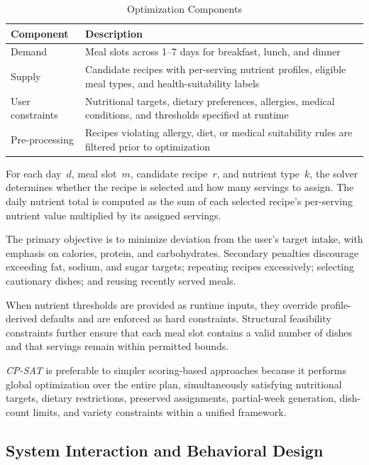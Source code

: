 \documentclass[conference]{IEEEtran}
\begin{document}
\begin{table}[H]
\caption{Optimization Components}
\label{tab:optim}
\begin{center}
\begin{tabular}{p{1.8cm}p{5.8cm}}
\toprule
\textbf{Component} & \textbf{Description} \\
\midrule
Demand & Meal slots across 1--7 days for breakfast, lunch, and dinner \\
Supply & Candidate recipes with per-serving nutrient profiles, eligible meal types, and health-suitability labels \\
User constraints & Nutritional targets, dietary preferences, allergies, medical conditions, and thresholds specified at runtime \\
Pre-processing & Recipes violating allergy, diet, or medical suitability rules are filtered prior to optimization \\
\bottomrule
\end{tabular}
\end{center}
\end{table}

For each day~$d$, meal slot~$m$, candidate recipe~$r$, and nutrient type~$k$, the solver determines whether the recipe is selected and how many servings to assign. The daily nutrient total is computed as the sum of each selected recipe's per-serving nutrient value multiplied by its assigned servings.

The primary objective is to minimize deviation from the user's target intake, with emphasis on calories, protein, and carbohydrates. Secondary penalties discourage exceeding fat, sodium, and sugar targets; repeating recipes excessively; selecting cautionary dishes; and reusing recently served meals.

When nutrient thresholds are provided as runtime inputs, they override profile-derived defaults and are enforced as hard constraints. Structural feasibility constraints further ensure that each meal slot contains a valid number of dishes and that servings remain within permitted bounds.

\textit{CP-SAT} is preferable to simpler scoring-based approaches because it performs global optimization over the entire plan, simultaneously satisfying nutritional targets, dietary restrictions, preserved assignments, partial-week generation, dish-count limits, and variety constraints within a unified framework.

\subsection{System Interaction and Behavioral Design}
\end{document}
